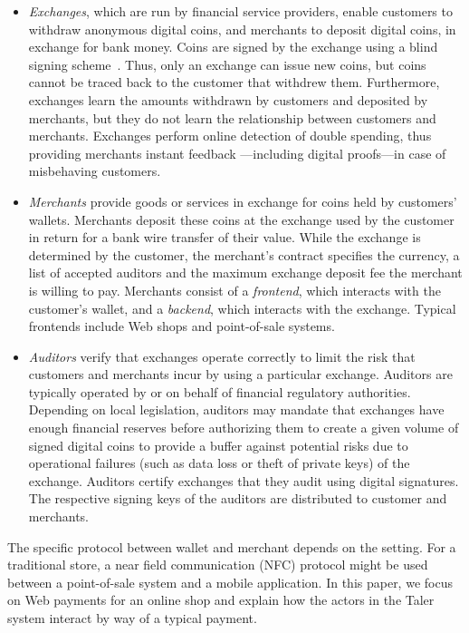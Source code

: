 \documentclass{llncs}
\begin{document}
\begin{itemize}
\item
{\em Exchanges}, which are run by financial service providers, enable
customers to withdraw anonymous digital coins,
and merchants to deposit digital coins, in exchange for
bank money.  Coins are signed by the exchange using
a blind signing scheme~\cite{chaum1983blind}.  Thus, only
an exchange can issue new coins, but coins cannot be traced back
to the customer that withdrew them.
Furthermore, exchanges learn the amounts withdrawn by customers
and deposited by merchants, but they do not learn the relationship
between customers and merchants.  Exchanges perform online detection
of double spending, thus providing merchants instant feedback
---including digital proofs---in case of misbehaving customers.

\item
{\em Merchants} provide goods or services in exchange for coins held
by customers' wallets.  Merchants deposit these coins at the
exchange used by the customer in return for a bank wire
transfer of their value.  While the exchange is determined by
the customer, the merchant's contract specifies the currency,
a list of accepted auditors and the maximum exchange deposit
fee the merchant is willing to pay.  Merchants consist of a
{\em frontend}, which interacts with the customer's wallet, and a {\em
backend}, which interacts with the exchange.  Typical frontends include
Web shops and point-of-sale systems.

\item
{\em Auditors} verify that exchanges operate correctly to limit the risk
that customers and merchants incur by using a particular exchange.
Auditors are typically operated by or on behalf of financial regulatory authorities.
Depending on local legislation, auditors may mandate that exchanges
have enough financial reserves before authorizing them to create a given
volume of signed digital coins to provide a buffer against potential risks due to
operational failures (such as data loss or theft of private keys) of the exchange.
Auditors certify exchanges that they audit using digital signatures.  The
respective signing keys of the auditors are distributed to customer and
merchants.
\end{itemize}


The specific protocol between wallet and merchant depends on the
setting.  For a traditional store, a near field communication (NFC)
protocol might be used between a point-of-sale system and a mobile
application.  In this paper, we focus on Web payments for an online
shop and explain how the actors in the Taler system interact by way of
a typical payment.
\end{document}
